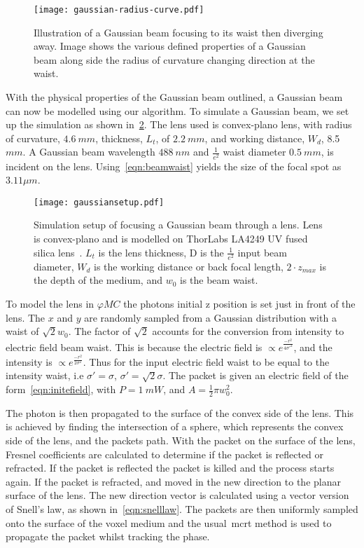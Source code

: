 \begin{figure}[!ht]
    \centering
    \texttt{[image: gaussian-radius-curve.pdf]}
    \caption{Illustration of a Gaussian beam focusing to its waist then diverging away. Image shows the various defined properties of a Gaussian beam along side the radius of curvature changing direction at the waist.}
    \label{fig:gbeamills}
\end{figure}

With the physical properties of the Gaussian beam outlined, a Gaussian beam can now be modelled using our algorithm.
To simulate a Gaussian beam, we set up the simulation as shown in~\cref{fig:gausssetup}.
The lens used is convex-plano lens, with radius of curvature, $4.6~mm$, thickness, $L_t$, of $2.2~mm$, and working distance, $W_d$, 8.5~$mm$.
A Gaussian beam wavelength $488~nm$ and $\tfrac{1}{e^2}$ waist diameter $0.5~mm$, is incident on the lens.
Using~\cref{eqn:beamwaist} yields the size of the focal spot as $3.11\mu m$.

\begin{figure}[!ht]
    \centering
    \texttt{[image: gaussiansetup.pdf]}
    \caption{Simulation setup of focusing a Gaussian beam through a lens. Lens is convex-plano and is modelled on ThorLabs LA4249 UV fused silica lens~\cite{thorlens}.  $L_t$ is the lens thickness, D is the $\tfrac{1}{e^2}$ input beam diameter, $W_d$ is the working distance or back focal length, $2 \cdot z_{max}$ is the depth of the medium, and $w_0$ is the beam waist.}
    \label{fig:gausssetup}
\end{figure}

To model the lens in $\varphi MC$ the photons initial z position is set just in front of the lens.
The $x$ and $y$ are randomly sampled from a Gaussian distribution with a waist of $\sqrt{2}w_0$.
The factor of $\sqrt{2}$ accounts for the conversion from intensity to electric field beam waist.
This is because the electric field is $\propto e^{\tfrac{-r^2}{4\sigma'^2}}$, and the intensity is $\propto e^{\tfrac{-r^2}{2\sigma^2}}$.
Thus for the input electric field waist to be equal to the intensity waist, i.e $\sigma'=\sigma$, $\sigma'=\sqrt{2}\sigma$.
The packet is given an electric field of the form~\cref{eqn:initefield}, with $P=1~mW$, and $A=\tfrac{1}{2}\pi w_0^2$.

The photon is then propagated to the surface of the convex side of the lens.
This is achieved by finding the intersection of a sphere, which represents the convex side of the lens, and the packets path.
With the packet on the surface of the lens, Fresnel coefficients are calculated to determine if the packet is reflected or refracted.
If the packet is reflected the packet is killed and the process starts again.
If the packet is refracted, and moved in the new direction to the planar surface of the lens.
The new direction vector is calculated using a vector version of Snell's law, as shown in~\cref{eqn:snelllaw}.
The packets are then uniformly sampled onto the surface of the voxel medium and the usual~\gls*{mcrt} method is used to propagate the packet whilst tracking the phase.

